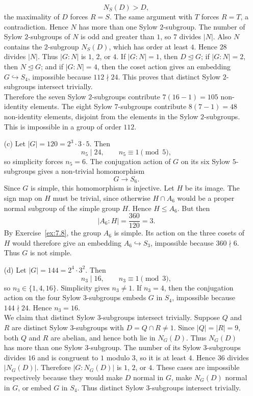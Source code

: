 \documentclass[../Odyssey_Project.tex]{subfiles}
\begin{document}
\begin{solution}
\begin{enumerate}
\[            N_S(D)>D,
        \]
        the maximality of $D$ forces $R=S$. The same argument with $T$ forces $R=T$, a contradiction. Hence $N$ has more than one Sylow $2$-subgroup. The number of Sylow $2$-subgroups of $N$ is odd and greater than $1$, so $7$ divides $|N|$. Also $N$ contains the $2$-subgroup $N_S(D)$, which has order at least $4$. Hence $28$ divides $|N|$. Thus $|G:N|$ is $1$, $2$, or $4$. If $|G:N|=1$, then $D\trianglelefteq G$; if $|G:N|=2$, then $N\trianglelefteq G$; and if $|G:N|=4$, then the coset action gives an embedding $G\hookrightarrow S_4$, impossible because $112\nmid 24$. This proves that distinct Sylow $2$-subgroups intersect trivially.\\
        Therefore the seven Sylow $2$-subgroups contribute $7(16-1)=105$ non-identity elements. The eight Sylow $7$-subgroups contribute $8(7-1)=48$ non-identity elements, disjoint from the elements in the Sylow $2$-subgroups. This is impossible in a group of order $112$.
        \item[(c)] Let $|G|=120=2^3\cdot 3\cdot 5$. Then
        \[
            n_5\mid 24,\qquad n_5\equiv 1\pmod 5,
        \]
        so simplicity forces $n_5=6$. The conjugation action of $G$ on its six Sylow $5$-subgroups gives a non-trivial homomorphism
        \[
            G\to S_6.
        \]
        Since $G$ is simple, this homomorphism is injective. Let $H$ be its image. The sign map on $H$ must be trivial, since otherwise $H\cap A_6$ would be a proper normal subgroup of the simple group $H$. Hence $H\leq A_6$. But then
        \[
            |A_6:H|=\frac{360}{120}=3.
        \]
        By Exercise~\ref{ex:7.8}, the group $A_6$ is simple. Its action on the three cosets of $H$ would therefore give an embedding $A_6\hookrightarrow S_3$, impossible because $360\nmid 6$. Thus $G$ is not simple.
        \item[(d)] Let $|G|=144=2^4\cdot 3^2$. Then
        \[
            n_3\mid 16,\qquad n_3\equiv 1\pmod 3,
        \]
        so $n_3\in\{1,4,16\}$. Simplicity gives $n_3\neq 1$. If $n_3=4$, then the conjugation action on the four Sylow $3$-subgroups embeds $G$ in $S_4$, impossible because $144\nmid 24$. Hence $n_3=16$.\\
        We claim that distinct Sylow $3$-subgroups intersect trivially. Suppose $Q$ and $R$ are distinct Sylow $3$-subgroups with $D=Q\cap R\neq 1$. Since $|Q|=|R|=9$, both $Q$ and $R$ are abelian, and hence both lie in $N_G(D)$. Thus $N_G(D)$ has more than one Sylow $3$-subgroup. The number of its Sylow $3$-subgroups divides $16$ and is congruent to $1$ modulo $3$, so it is at least $4$. Hence $36$ divides $|N_G(D)|$. Therefore $|G:N_G(D)|$ is $1$, $2$, or $4$. These cases are impossible respectively because they would make $D$ normal in $G$, make $N_G(D)$ normal in $G$, or embed $G$ in $S_4$. Thus distinct Sylow $3$-subgroups intersect trivially.\\

\end{enumerate}
\end{solution}
\end{document}
